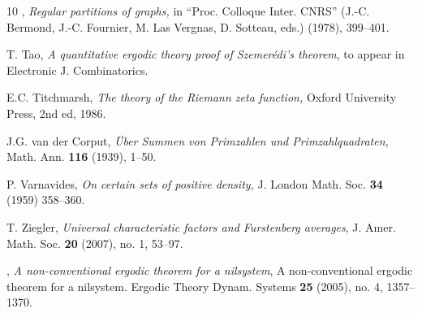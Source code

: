 \documentclass[12pt,a4paper,reqno]{amsart}
\numberwithin{equation}{section}
\theoremstyle{plain}
\theoremstyle{definition}
\def\emph#1{{\it #1}}
\def\textbf#1{{\bf #1}}
\begin{document}
\begin{thebibliography}{10}
\bysame, \emph{Regular partitions of graphs,} in ``Proc. Colloque Inter. CNRS'' (J.-C. Bermond, J.-C. Fournier, M. Las Vergnas, D. Sotteau, eds.) (1978), 399--401.

T. Tao, \emph{A quantitative ergodic theory proof of Szemer\'edi's theorem}, to appear in Electronic J. Combinatorics.

E.C. Titchmarsh, \emph{The theory of the Riemann zeta function,} Oxford University Press, 2nd ed, 1986.

J.G. van der Corput, \emph{\"Uber Summen von Primzahlen und Primzahlquadraten,} Math. Ann. \textbf{116} (1939), 1--50.

 P. Varnavides, \emph{On certain sets of positive density,} J. London Math. Soc. \textbf{34} (1959) 358--360.

 T. Ziegler, \emph{Universal characteristic factors and Furstenberg averages}, J. Amer. Math. Soc.  \textbf{20}  (2007),  no. 1, 53--97.

\bysame, \emph{A non-conventional ergodic theorem for a nilsystem}, A non-conventional ergodic theorem for a nilsystem.  Ergodic Theory Dynam. Systems  \textbf{25}  (2005),  no. 4, 1357--1370.

\end{thebibliography}


     
\end{document}
